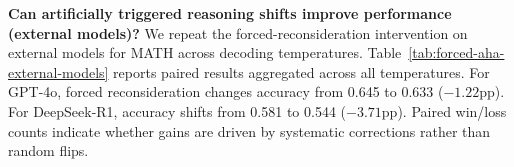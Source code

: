 \noindent
\textbf{Can artificially triggered reasoning shifts improve performance (external models)?}
We repeat the forced-reconsideration intervention on external models for \textsc{MATH} across decoding temperatures. Table~\ref{tab:forced-aha-external-models} reports paired results aggregated across all temperatures. For GPT-4o, forced reconsideration changes accuracy from 0.645 to 0.633 ($-1.22$pp). For DeepSeek-R1, accuracy shifts from 0.581 to 0.544 ($-3.71$pp). Paired win/loss counts indicate whether gains are driven by systematic corrections rather than random flips.

